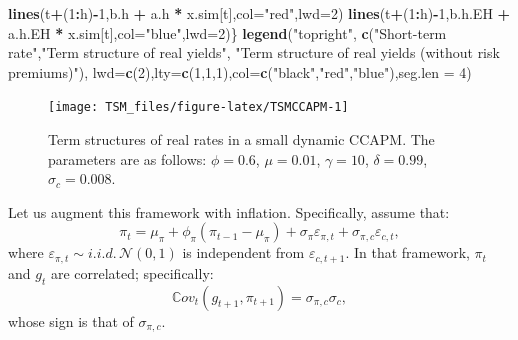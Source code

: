 \documentclass[
  12pt,
]{book}
\newenvironment{Shaded}{\begin{snugshade}}{\end{snugshade}}
\newcommand{\AttributeTok}[1]{\textcolor[rgb]{0.13,0.29,0.53}{#1}}
\newcommand{\DecValTok}[1]{\textcolor[rgb]{0.00,0.00,0.81}{#1}}
\newcommand{\FunctionTok}[1]{\textcolor[rgb]{0.13,0.29,0.53}{\textbf{#1}}}
\newcommand{\NormalTok}[1]{#1}
\newcommand{\SpecialCharTok}[1]{\textcolor[rgb]{0.81,0.36,0.00}{\textbf{#1}}}
\newcommand{\StringTok}[1]{\textcolor[rgb]{0.31,0.60,0.02}{#1}}
\theoremstyle{definition}
\theoremstyle{definition}
\theoremstyle{definition}
\theoremstyle{definition}
\theoremstyle{remark}
\begin{document}
\begin{Shaded}
\begin{Highlighting}[]
  \FunctionTok{lines}\NormalTok{(t}\SpecialCharTok{+}\NormalTok{(}\DecValTok{1}\SpecialCharTok{:}\NormalTok{h)}\SpecialCharTok{{-}}\DecValTok{1}\NormalTok{,b.h    }\SpecialCharTok{+}\NormalTok{ a.h    }\SpecialCharTok{*}\NormalTok{ x.sim[t],}\AttributeTok{col=}\StringTok{"red"}\NormalTok{,}\AttributeTok{lwd=}\DecValTok{2}\NormalTok{)}
  \FunctionTok{lines}\NormalTok{(t}\SpecialCharTok{+}\NormalTok{(}\DecValTok{1}\SpecialCharTok{:}\NormalTok{h)}\SpecialCharTok{{-}}\DecValTok{1}\NormalTok{,b.h.EH }\SpecialCharTok{+}\NormalTok{ a.h.EH }\SpecialCharTok{*}\NormalTok{ x.sim[t],}\AttributeTok{col=}\StringTok{"blue"}\NormalTok{,}\AttributeTok{lwd=}\DecValTok{2}\NormalTok{)\}}
\FunctionTok{legend}\NormalTok{(}\StringTok{"topright"}\NormalTok{,}
       \FunctionTok{c}\NormalTok{(}\StringTok{"Short{-}term rate"}\NormalTok{,}\StringTok{"Term structure of real yields"}\NormalTok{,}
         \StringTok{"Term structure of real yields (without risk premiums)"}\NormalTok{),}
       \AttributeTok{lwd=}\FunctionTok{c}\NormalTok{(}\DecValTok{2}\NormalTok{),}\AttributeTok{lty=}\FunctionTok{c}\NormalTok{(}\DecValTok{1}\NormalTok{,}\DecValTok{1}\NormalTok{,}\DecValTok{1}\NormalTok{),}\AttributeTok{col=}\FunctionTok{c}\NormalTok{(}\StringTok{"black"}\NormalTok{,}\StringTok{"red"}\NormalTok{,}\StringTok{"blue"}\NormalTok{),}\AttributeTok{seg.len =} \DecValTok{4}\NormalTok{)}
\end{Highlighting}
\end{Shaded}

\begin{figure}
\texttt{[image: TSM\_files/figure-latex/TSMCCAPM-1]} \caption{Term structures of real rates in a small dynamic CCAPM. The parameters are as follows: $\phi=0.6$, $\mu = 0.01$, $\gamma=10$, $\delta = 0.99$, $\sigma_c=0.008$.}\label{fig:TSMCCAPM}
\end{figure}

Let us augment this framework with inflation. Specifically, assume that:
\[
\pi_t = \mu_\pi + \phi_\pi (\pi_{t-1} - \mu_\pi) + \sigma_\pi \varepsilon_{\pi,t} + \sigma_{\pi,c}\varepsilon_{c,t},
\]
where \(\varepsilon_{\pi,t} \sim i.i.d.\,\mathcal{N}(0,1)\) is independent from \(\varepsilon_{c,t+1}\). In that framework, \(\pi_t\) and \(g_t\) are correlated; specifically:
\[
\mathbb{C}ov_t(g_{t+1},\pi_{t+1}) = \sigma_{\pi,c}\sigma_{c},
\]
whose sign is that of \(\sigma_{\pi,c}\).
\end{document}
